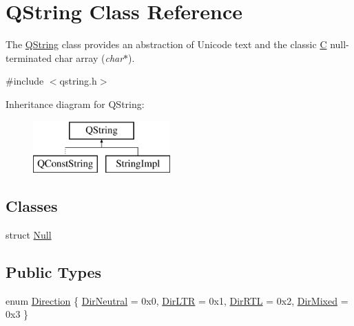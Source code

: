 \hypertarget{class_q_string}{}\section{Q\+String Class Reference}
\label{class_q_string}


The \mbox{\hyperlink{class_q_string}{Q\+String}} class provides an abstraction of Unicode text and the classic \mbox{\hyperlink{class_c}{C}} null-\/terminated char array ({\itshape char$\ast$}).  




{\ttfamily \#include $<$qstring.\+h$>$}

Inheritance diagram for Q\+String\+:\begin{figure}[H]
\begin{center}
\leavevmode
\includegraphics[height=2.000000cm]{class_q_string}
\end{center}
\end{figure}
\subsection*{Classes}
\begin{DoxyCompactItemize}
\item 
struct \mbox{\hyperlink{struct_q_string_1_1_null}{Null}}
\end{DoxyCompactItemize}
\subsection*{Public Types}
\begin{DoxyCompactItemize}
\item 
enum \mbox{\hyperlink{class_q_string_acaff43b133319ea651f19aac6b967406}{Direction}} \{ \mbox{\hyperlink{class_q_string_acaff43b133319ea651f19aac6b967406aa9e64c5b47ed1e0cb5badd8ebbcc2907}{Dir\+Neutral}} = 0x0, 
\mbox{\hyperlink{class_q_string_acaff43b133319ea651f19aac6b967406a3d016d8ec10d90bf372aee5bf8ae890c}{Dir\+L\+TR}} = 0x1, 
\mbox{\hyperlink{class_q_string_acaff43b133319ea651f19aac6b967406affa060e9d0531d7b5a4f5839ba536833}{Dir\+R\+TL}} = 0x2, 
\mbox{\hyperlink{class_q_string_acaff43b133319ea651f19aac6b967406a3b734051e36983018c3a38a3b3da66c7}{Dir\+Mixed}} = 0x3
 \}
\end{DoxyCompactItemize}
